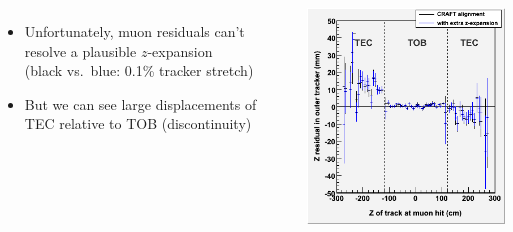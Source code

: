 \documentclass[compress]{beamer}
\begin{document}
\begin{frame}
\begin{columns}
\begin{itemize}
\item Unfortunately, muon residuals can't resolve a plausible
  $z$-expansion \\ (black vs.\ blue: 0.1\% tracker stretch)

\item But we can see large displacements of TEC relative to TOB (discontinuity)

\end{itemize}

\includegraphics[width=\linewidth]{resid_from_tracker_outer_zexpand.png}

\end{columns}
\end{frame}
\end{document}
